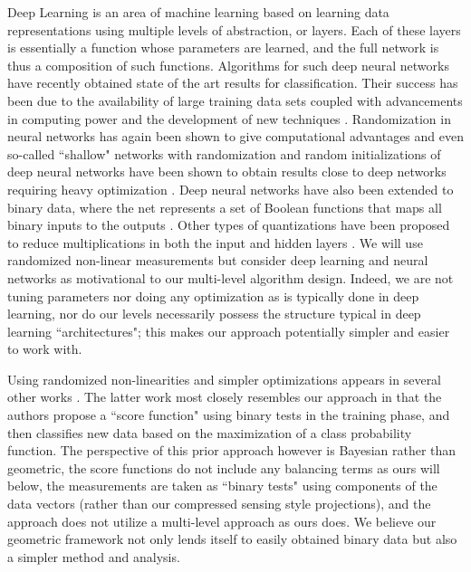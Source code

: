 \documentclass[twoside,11pt]{article}
\newcommand{\edit}[1]{{{#1}}}
\begin{document}
Deep Learning is an area of machine learning based on learning data representations using multiple \edit{level}s of abstraction, or layers. Each of these layers is essentially a function whose parameters are learned, and the full network is thus a composition of such functions.  Algorithms for such deep neural networks  have recently obtained state of the art results for classification. Their success has been due to the availability of large training data sets coupled with advancements in computing power and the development of new techniques \citep{krizhevsky2012imagenet,simonyan2014very,szegedy2015going,russakovsky2015imagenet}. 
\edit{Randomization in neural networks has again been shown to give computational advantages and even so-called ``shallow" networks with randomization and random initializations of deep neural networks have been shown to obtain results close to deep networks requiring heavy optimization \citep{rahimi2009weighted,giryes2016deep}.  Deep neural networks have also been extended to binary data, where the net represents a set of
Boolean functions that maps all binary inputs to the outputs \citep{kim2016bitwise,courbariaux2015binaryconnect,courbariaux2016binarized}.  Other types of quantizations have been proposed to reduce multiplications in both the input and hidden layers \citep{lin2015neural,marchesi1993fast,simard1994backpropagation,burge1999rising,rastegari2016xnor,hubara2016quantized}. 
We will use randomized non-linear measurements but} consider deep learning and neural networks as motivational to our multi-\edit{level} algorithm design.  \edit{Indeed,} we are not tuning parameters nor \edit{doing any optimization} as is typically done in deep learning, nor do our \edit{level}s necessarily possess the structure typical in deep learning ``architectures"; this makes our approach potentially simpler and easier to work with. 

\edit{Using randomized non-linearities and simpler optimizations appears in several other works \citep{rahimi2009weighted,ozuysal2010fast}. The latter work most closely resembles our approach in that the authors propose a ``score function" using binary tests in the training phase, and then classifies new data based on the maximization of a class probability function. The perspective of this prior approach however is Bayesian rather than geometric, the score functions do not include any balancing terms as ours will below, the measurements are taken as ``binary tests" using components of the data vectors (rather than our compressed sensing style projections), and the approach does not utilize a multi-level approach as ours does. We believe our geometric framework not only lends itself to easily obtained binary data but also a simpler method and analysis. }
\end{document}
